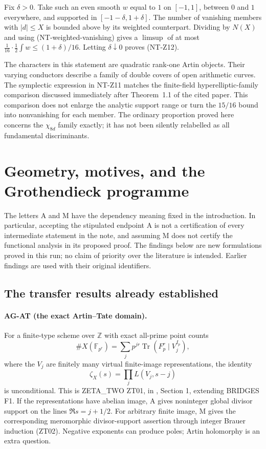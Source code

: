 \documentclass[11pt,a4paper]{article}
\begin{document}
Fix $\delta>0$.  Take such an even smooth $w$ equal to $1$ on
$[-1,1]$, between $0$ and $1$ everywhere, and supported in
$[-1-\delta,1+\delta]$.  The number of vanishing members with
$|d|\le X$ is bounded above by its weighted counterpart.  Dividing by
$N(X)$ and using (NT-weighted-vanishing) gives a $\limsup$ of at most
$\frac1{16}\cdot\frac12\int w\le(1+\delta)/16$.
Letting $\delta\downarrow0$ proves (NT-Z12).

The characters in this statement are quadratic rank-one Artin objects.
Their varying conductors describe a family of double covers of open
arithmetic curves.  The symplectic expression in NT-Z11 matches the
finite-field hyperelliptic-family comparison discussed immediately after
Theorem~1.1 of the cited paper.  This comparison does not enlarge the
analytic support range or turn the $15/16$ bound into nonvanishing for
each member.  The ordinary proportion proved here concerns the
$\chi_{8d}$ family exactly; it has not been silently relabelled as all
fundamental discriminants.


\section{Geometry, motives, and the Grothendieck programme}
\label{sec:geometry}

The letters A and M have the dependency meaning fixed in the introduction.
In particular, accepting the stipulated endpoint A is not a certification of
every intermediate statement in the note, and assuming M does not certify
the functional analysis in its proposed proof. The findings below are new
formulations proved in this run; no claim of priority over the literature is
intended. Earlier findings are used with their original identifiers.

\subsection{The transfer results already established}
\label{ag:transfer}

\paragraph{AG-AT (the exact Artin--Tate domain).}
For a finite-type scheme over $\mathbb Z$ with exact all-prime point counts
\[
 \#X(\mathbb F_{p^r})=
 \sum_j p^{jr}\operatorname{Tr}(F_p^r\mid V_j^{I_p}),
\]
where the $V_j$ are finitely many virtual finite-image representations,
the identity
\[
 \zeta_X(s)=\prod_j L(V_j,s-j)
\]
is unconditional. This is ZETA\_TWO ZT01, in
, Section 1,
extending BRIDGES F1. If the representations have abelian image, A gives
noninteger global divisor support on the lines $\Re s=j+1/2$.
For arbitrary finite image, M gives the corresponding meromorphic
divisor-support assertion through integer Brauer induction (ZT02).
Negative exponents can produce poles; Artin holomorphy is an extra question.
\end{document}
